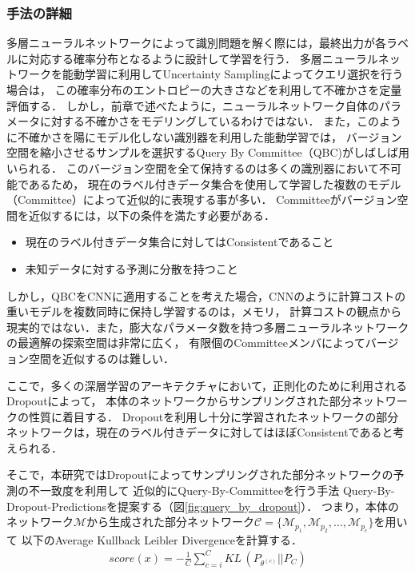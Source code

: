 \subsubsection{手法の詳細}
多層ニューラルネットワークによって識別問題を解く際には，最終出力が各ラベルに対応する確率分布となるように設計して学習を行う．
多層ニューラルネットワークを能動学習に利用してUncertainty Samplingによってクエリ選択を行う場合は，
この確率分布のエントロピーの大きさなどを利用して不確かさを定量評価する．
しかし，前章で述べたように，ニューラルネットワーク自体のパラメータに対する不確かさをモデリングしているわけではない．
また，このように不確かさを陽にモデル化しない識別器を利用した能動学習では，
バージョン空間を縮小させるサンプルを選択するQuery By Committee（QBC)\cite{seung1992query}がしばしば用いられる．
このバージョン空間を全て保持するのは多くの識別器において不可能であるため，
現在のラベル付きデータ集合を使用して学習した複数のモデル（Committee）によって近似的に表現する事が多い．
Committeeがバージョン空間を近似するには，以下の条件を満たす必要がある．
\begin{itemize}
\item 現在のラベル付きデータ集合に対してはConsistentであること
\item 未知データに対する予測に分散を持つこと
\end{itemize}
しかし，QBCをCNNに適用することを考えた場合，CNNのように計算コストの重いモデルを複数同時に保持し学習するのは，メモリ，
計算コストの観点から現実的ではない．また，膨大なパラメータ数を持つ多層ニューラルネットワークの最適解の探索空間は非常に広く，
有限個のCommitteeメンバによってバージョン空間を近似するのは難しい．

ここで，多くの深層学習のアーキテクチャにおいて，正則化のために利用されるDropoutによって，
本体のネットワークからサンプリングされた部分ネットワークの性質に着目する．
Dropoutを利用し十分に学習されたネットワークの部分ネットワークは，現在のラベル付きデータに対してはほぼConsistentであると考えられる．

そこで，本研究ではDropoutによってサンプリングされた部分ネットワークの予測の不一致度を利用して
近似的にQuery-By-Committeeを行う手法 Query-By-Dropout-Predictionsを提案する（図\ref{fig:query_by_dropout}）．
つまり，本体のネットワーク$\mathcal{M}$から生成された部分ネットワーク$\mathcal{C} = \{\mathcal{M}_{p_1}, \mathcal{M}_{p_2}, \dots, \mathcal{M}_{p_c} \}$を用いて
以下のAverage Kullback Leibler Divergenceを計算する．
\begin{eqnarray}
    score(x) =  -  \frac{1}{C} \sum_{c=i}^C KL \, (P_{\theta^{(c)}} || P_C)
\end{eqnarray}

